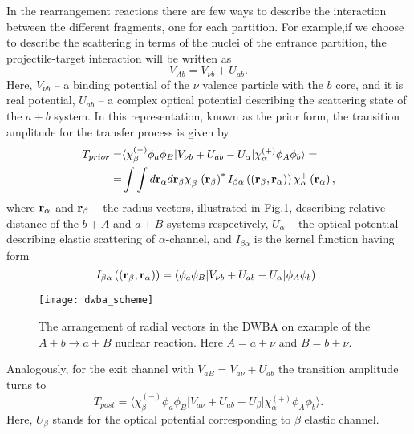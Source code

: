 \documentclass[
12pt, %
oneside, %
english, %
doublespacing, %
doublespacing, %
toctotoc, %
parskip, %
headsepline, %
]{MastersDoctoralThesis} %
\begin{document}
In the rearrangement reactions there are few ways to describe the interaction between the different fragments, one for each partition. 
For example,if we choose to describe the scattering in terms of the nuclei of the entrance partition, the projectile-target interaction will be written as
\begin{equation}
V_{Ab}=V_{\nu b} + U_{ab}.
\end{equation}
Here, $V_{\nu b}$ -- a binding potential of the $\nu$ valence particle with the $b$ core, and it is real potential, $U_{ab}$ -- a complex optical potential describing the scattering state of the $a+b$ system.  
In this representation, known as the prior form, the transition amplitude for the transfer process is given by
 \begin{align}
 T_{prior} =& \langle \chi_\beta^{(-)} \phi_a \phi_B  \vert
  V_{\nu b}+U_{ab}-U_{\alpha} \vert
   \chi_\alpha^{(+)} \phi_A \phi_b \rangle = 
   \nonumber \\
= & \int \int d {\bf r}_\alpha  d {\bf r}_\beta
\chi^{-}_\beta \left( {\bf r}_\beta \right)^* 
I_{\beta \alpha}  \left( \left( {\bf r}_\beta ,  {\bf r}_\alpha \right) \right)
\chi^{+}_\alpha \left( {\bf r}_\alpha \right),
\label{dwba_amplitude}
 \end{align}
where ${\bf r}_\alpha$ and ${\bf r}_\beta$ -- the radius vectors, illustrated in Fig.\ref{fig:dwba_scheme}, describing relative distance of the $b+A$ and $a+B$ systems respectively,  $U_\alpha$ -- the optical potential describing elastic scattering of $\alpha$-channel, and $I_{\beta \alpha}$ is the kernel function having form
\begin{equation}
I_{\beta \alpha}  \left( \left( {\bf r}_\beta ,  {\bf r}_\alpha \right) \right) =
\left( \phi_a \phi_B  \vert 
 V_{\nu b}+U_{ab}-U_{\alpha} \vert
 \phi_A \phi_b  \right).
\end{equation}
 
\begin{figure}[tp]
\centering
\texttt{[image: dwba\_scheme]}
\decoRule
\caption{  The arrangement of radial vectors in the DWBA 
on example of the $A+b \rightarrow a + B$ nuclear reaction. Here $A=a+\nu$ 
and $B=b+\nu$. }
\label{fig:dwba_scheme}
\end{figure} 
 
 Analogously, for the exit channel with $V_{aB}= V_{a \nu}+U_{ab}$ the transition amplitude turns to
\begin{equation}
T_{post}=  \langle \chi_\beta^{(-)} \phi_a \phi_B  \vert
  V_{a \nu}+U_{ab}-U_{\beta} \vert
   \chi_\alpha^{(+)} \phi_A \phi_b \rangle.
\end{equation}
Here, $U_\beta$ stands for the optical potential corresponding to $\beta$ elastic channel. 
 
\end{document}

